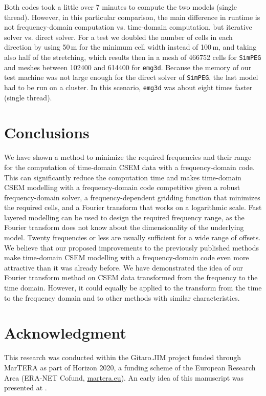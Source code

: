 \documentclass[
    manuscript,
  ]{geophysics}
\newcommand{\emg}[2]{\texttt{emg#1#2}\xspace}
\newcommand{\simpeg}{\texttt{SimPEG}\xspace}
\begin{document}
Both codes took a little over 7 minutes to compute the two models (single
thread). However, in this particular comparison, the main difference in runtime
is not frequency-domain computation vs. time-domain computation, but iterative
solver vs. direct solver. For a test we doubled the number of cells in each
direction by using 50\,m for the minimum cell width instead of 100\,m, and
taking also half of the stretching, which results then in a mesh of
\num{466752} cells for \simpeg and meshes between \num{102400} and \num{614400}
for \emg3d. Because the memory of our test machine was not large enough for the
direct solver of \simpeg, the last model had to be run on a cluster. In this
scenario, \emg3d was about eight times faster (single thread).

\section{Conclusions}

We have shown a method to minimize the required frequencies and their range for
the computation of time-domain CSEM data with a frequency-domain code. This can
significantly reduce the computation time and makes time-domain CSEM modelling
with a frequency-domain code competitive given a robust frequency-domain
solver, a frequency-dependent gridding function that minimizes the required
cells, and a Fourier transform that works on a logarithmic scale. Fast layered
modelling can be used to design the required frequency range, as the Fourier
transform does not know about the dimensionality of the underlying model.
Twenty frequencies or less are usually sufficient for a wide range of offsets.
We believe that our proposed improvements to the previously published methods
make time-domain CSEM modelling with a frequency-domain code even more
attractive than it was already before. We have demonstrated the idea of our
Fourier transform method on CSEM data transformed from the frequency to the
time domain. However, it could equally be applied to the transform from the
time to the frequency domain and to other methods with similar
characteristics.

\section{Acknowledgment}

This research was conducted within the Gitaro.JIM project funded through
MarTERA as part of Horizon 2020, a funding scheme of the European Research Area
(ERA-NET Cofund, \href{https://www.martera.eu}{martera.eu}).
An early idea of this manuscript was presented at \cite{EAGE.20.Werthmuller}.
\end{document}

